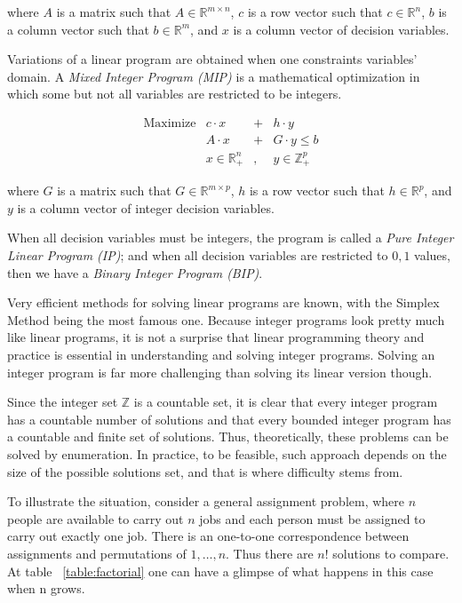 where $A$ is a matrix such that $A \in \mathbb{R}^{m \times n}$, $c$ is a row vector such that $c \in \mathbb{R}^n$, $b$ is a column vector such that $b \in \mathbb{R}^m$, and $x$ is a column vector of decision variables.

Variations of a linear program are obtained when one constraints variables' domain. A \textit{Mixed Integer Program (MIP)} is a mathematical optimization in which some but not all variables are restricted to be integers. 

$$
\begin{array}{rlll}
   \mbox{Maximize} & c \cdot x & +  & h \cdot y
								\\ & A \cdot x & +  & G \cdot y \le b
								\\ & x \in \mathbb{R}^{n}_{+} &, & y \in \mathbb{Z}^{p}_{+}
\end{array}
$$

where $G$ is a matrix such that $G \in \mathbb{R}^{m \times p}$, $h$ is a row vector such that $h \in \mathbb{R}^p$, and $y$ is a column vector of integer decision variables.

When all decision variables must be integers, the program is called a \textit{Pure Integer Linear Program (IP)}; and when all decision variables are restricted to ${0,1}$ values, then we have a \textit{Binary Integer Program (BIP)}.

Very efficient methods for solving linear programs are known, with the Simplex Method being the most famous one. Because integer programs look pretty much like linear programs, it is not a surprise that linear programming theory and practice is essential in understanding and solving integer programs. Solving an integer program is far more challenging than solving its linear version though.

Since the integer set $\mathbb{Z}$ is a countable set, it is clear that every integer program has a countable number of solutions and that every bounded integer program has a countable and finite set of solutions. Thus, theoretically, these problems can be solved by enumeration. In practice, to be feasible, such approach depends on the size of the possible solutions set, and that is where difficulty stems from.

To illustrate the situation, consider a general assignment problem, where $n$ people are available to carry out $n$ jobs and each person must be assigned to carry out exactly one job. There is an one-to-one correspondence between assignments and permutations of ${1, \ldots ,n}$. Thus there are $n!$ solutions to compare. At table ~\ref{table:factorial} one can have a glimpse of what happens in this case when n grows.

